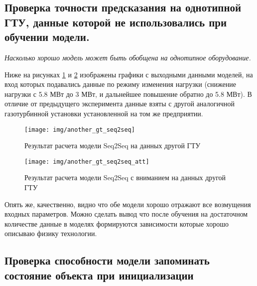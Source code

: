 \documentclass[12pt,a4paper]{article}
\begin{document}
\subsection{Проверка точности предсказания на однотипной ГТУ, данные которой не использовались при обучении модели.}

\textit{Насколько хорошо модель может быть обобщена на однотипное оборудование.}

Ниже на рисунках \ref{fig:another_gt_seq2seq} и \ref{fig:another_gt_seq2seq_att} изображены графики с выходными данными моделей, на вход которых подавались данные по режиму изменения нагрузки (снижение нагрузки с 5.8 МВт до 3 МВт, и дальнейшее повышение обратно до 5.8 МВт). В отличие от предыдущего эксперимента данные взяты с другой аналогичной газотурбинной установки установленной на том же предприятии.

\begin{figure}[htbp]
	\centering\texttt{[image: img/another\_gt\_seq2seq]}
	\caption{Результат расчета модели Seq2Seq на данных другой ГТУ}
	\label{fig:another_gt_seq2seq}
\end{figure}

\begin{figure}[htbp]
	\centering\texttt{[image: img/another\_gt\_seq2seq\_att]}
	\caption{Результат расчета модели Seq2Seq с вниманием на данных другой ГТУ}
	\label{fig:another_gt_seq2seq_att}
\end{figure}


Опять же, качественно, видно что обе модели хорошо отражают все возмущения входных параметров. Можно сделать вывод что после обучения на достаточном количестве данные в моделях формируются зависимости которые хорошо описываю физику технологии.

\newpage
\subsection{Проверка способности модели запоминать состояние объекта при инициализации}
\end{document}
